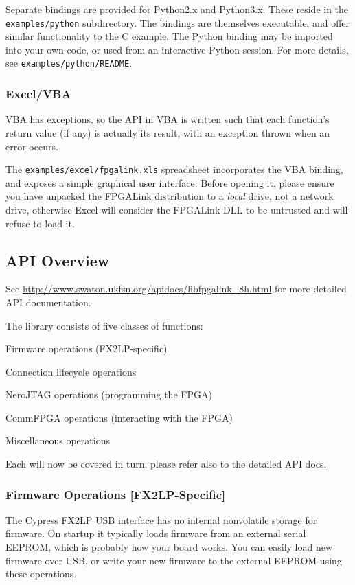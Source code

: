 Separate bindings are provided for Python2.x and Python3.x. These reside in the \texttt{examples/python} subdirectory. The bindings are themselves executable, and offer similar functionality to the C example. The Python binding may be imported into your own code, or used from an interactive Python session. For more details, see \texttt{examples/python/README}.

\subsubsection{Excel/VBA}
VBA has exceptions, so the API in VBA is written such that each function's return value (if any) is actually its result, with an exception thrown when an error occurs.

The \texttt{examples/excel/fpgalink.xls} spreadsheet incorporates the VBA binding, and exposes a simple graphical user interface. Before opening it, please ensure you have unpacked the FPGALink distribution to a \textit{local} drive, not a network drive, otherwise Excel will consider the FPGALink DLL to be untrusted and will refuse to load it.

\subsection{API Overview}
See \url{http://www.swaton.ukfsn.org/apidocs/libfpgalink\_8h.html} for more detailed API documentation.

The library consists of five classes of functions:

\begin{blobs}
  \item Firmware operations (FX2LP-specific)
  \item Connection lifecycle operations
  \item NeroJTAG operations (programming the FPGA)
  \item CommFPGA operations (interacting with the FPGA)
  \item Miscellaneous operations
\end{blobs}

Each will now be covered in turn; please refer also to the detailed API docs.

\newpage
\subsubsection{Firmware Operations [FX2LP-Specific]}
The Cypress FX2LP USB interface has no internal nonvolatile storage for firmware. On startup it typically loads firmware from an external serial EEPROM, which is probably how your board works. You can easily load new firmware over USB, or write your new firmware to the external EEPROM using these operations.

